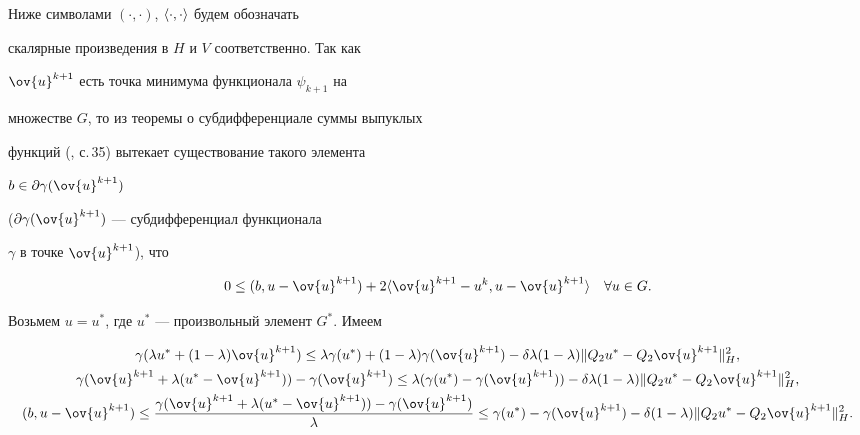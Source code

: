 Ниже символами $(\cdot,\cdot)$, $\langle \cdot,\cdot\rangle $ будем обозначать


скалярные произведения в $H$ и $V$ соответственно. Так как


$\ov{u}^{k+1}$ есть точка минимума функционала $\psi_{k+1}$ на


множестве $G$, то из теоремы о субдифференциале суммы выпуклых


функций (\cite{4}, с.\,35) вытекает существование такого элемента


$b\in\partial\gamma(\ov{u}^{k+1})$


($\partial\gamma(\ov{u}^{k+1})$ --- субдифференциал функционала


$\gamma$ в точке $\ov{u}^{k+1}$), что


\begin{equation}\label{3}


0\le


(b,u-\ov{u}^{k+1})+2\la \ov{u}^{k+1}-u^k,u-\ov{u}^{k+1}\ra \quad


\forall u\in G.


\end{equation}


Возьмем $u=u^*$, где $u^*$ --- произвольный элемент $G^*$. Имеем


\begin{gather*}


\gamma(\lambda u^*+(1-\lambda)\ov{u}^{k+1})\le


\lambda\gamma(u^*)+(1-\lambda)\gamma(\ov{u}^{k+1})-\delta\lambda


(1-\lambda)\|Q_2u^*-Q_2\ov{u}^{k+1}\|^2_H,\\


%


\gamma(\ov{u}^{k+1}+\lambda (u^*-\ov{u}^{k+1}))-


\gamma(\ov{u}^{k+1})\le


\lambda(\gamma(u^*)-\gamma(\ov{u}^{k+1}))-\delta\lambda


(1-\lambda)\|Q_2u^*-Q_2\ov{u}^{k+1}\|^2_H,\\


%


(b,u-\ov{u}^{k+1})\le\frac{\gamma(\ov{u}^{k+1}+\lambda (u^*-\ov{u}^{k+1}))-


\gamma(\ov{u}^{k+1})}\lambda\le


\gamma(u^*)-\gamma(\ov{u}^{k+1})-\delta


(1-\lambda)\|Q_2u^*-Q_2\ov{u}^{k+1}\|^2_H.


\end{gather*}



